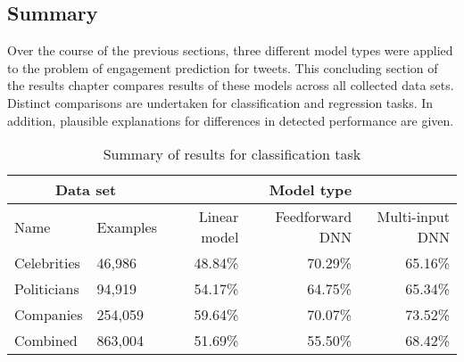 \subsection{Summary}
\label{sec:res_summary}

Over the course of the previous sections, three different model types were
applied to the problem of engagement prediction for tweets.
This concluding section of the results chapter compares results of these models
across all collected data sets.
Distinct comparisons are undertaken for classification and regression tasks.
In addition, plausible explanations for differences in detected performance are
given.

\begin{table}
\begin{tabular}{llrrr}
\toprule
\multicolumn{2}{c}{Data set} & \multicolumn{3}{c}{Model type} \\
\midrule
Name & Examples & Linear model & Feedforward DNN & Multi-input DNN \\
\midrule
Celebrities & 46,986 & 48.84\% & 70.29\% & 65.16\% \\
Politicians & 94,919 & 54.17\% & 64.75\% & 65.34\% \\
Companies & 254,059 & 59.64\% & 70.07\% & 73.52\% \\
Combined & 863,004 & 51.69\% & 55.50\% & 68.42\% \\
\bottomrule
\end{tabular}
\caption{Summary of results for classification task}
\label{tab:summary_classification}
\end{table}

